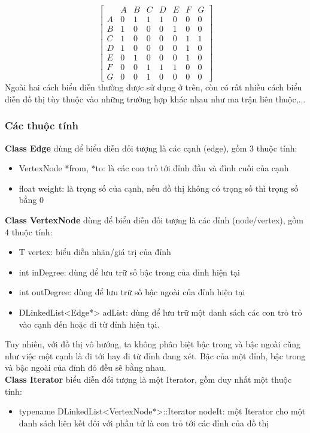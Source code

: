 \documentclass[a4paper]{article}
\begin{document}
\begin{equation*}
\begin{bmatrix}
 & A & B & C & D & E & F & G\\
A & 0 & 1 & 1 & 1 & 0 & 0 & 0\\
B & 1 & 0 & 0 & 0 & 1 & 0 & 0\\
C & 1 & 0 & 0 & 0 & 0 & 1 & 1\\
D & 1 & 0 & 0 & 0 & 0 & 1 & 0\\
E & 0 & 1 & 0 & 0 & 0 & 1 & 0\\
F & 0 & 0 & 1 & 1 & 1 & 0 & 0\\
G & 0 & 0 & 1 & 0 & 0 & 0 & 0
\end{bmatrix}
\end{equation*}
Ngoài hai cách biểu diễn thường được sử dụng ở trên, còn có rất nhiều cách biểu diễn đồ thị tùy thuộc vào những trường hợp khác nhau như ma trận liên thuộc,...
        \subsubsection{Các thuộc tính}
\textbf{Class Edge} dùng để biểu diễn đối tượng là các cạnh (edge), gồm 3 thuộc tính: 
\begin{itemize}
    \item VertexNode *from, *to: là các con trỏ tới đỉnh đầu và đỉnh cuối của cạnh
    \item float weight: là trọng số của cạnh, nếu đồ thị không có trọng số thì trọng số bằng 0
\end{itemize}
\textbf{Class VertexNode} dùng để biểu diễn đối tượng là các đỉnh (node/vertex), gồm 4 thuộc tính:
\begin{itemize}
    \item T vertex: biểu diễn nhãn/giá trị của đỉnh
    \item int inDegree: dùng để lưu trữ số bậc trong của đỉnh hiện tại
    \item int outDegree: dùng để lưu trữ số bậc ngoài của đỉnh hiện tại
    \item DLinkedList<Edge*> adList: dùng để lưu trữ một danh sách các con trỏ trỏ vào cạnh đến hoặc đi từ đỉnh hiện tại. 
\end{itemize}
Tuy nhiên, với đồ thị vô hướng, ta không phân biệt bậc trong và bậc ngoài cũng như việc một cạnh là đi tới hay đi từ đỉnh đang xét. Bậc của một đỉnh, bậc trong và bậc ngoài của đỉnh đó đều sẽ bằng nhau.\\

\textbf{Class Iterator} biểu diễn đối tượng là một Iterator, gồm duy nhất một thuộc tính:
\begin{itemize}
    \item typename DLinkedList<VertexNode*>::Iterator nodeIt: một Iterator cho một danh sách liên kết đôi với phần tử là con trỏ tới các đỉnh của đồ thị \\
\end{itemize}
\end{document}
